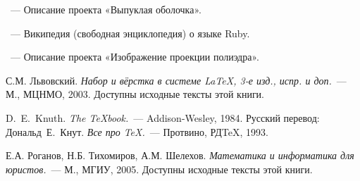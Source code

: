 \begin{thebibliography}{}

~---
Описание проекта «Выпуклая оболочка».

~---
Википедия (свободная энциклопедия) о языке Ruby.

~---
Описание проекта «Изображение проекции полиэдра».

С.М. Львовский.
{\em Набор и вёрстка в системе \LaTeX, 3-е изд., испр. и доп.}~---
М., МЦНМО, 2003. Доступны исходные тексты этой книги.

D.~E.~Knuth. {\em The \TeX{}book.}~---
Addison-Wesley, 1984. Русский перевод:
Дональд~Е.~Кнут.
{\em Все про \TeX.}~--- Протвино, РД\TeX, 1993.

Е.А. Роганов, Н.Б. Тихомиров, А.М. Шелехов.
{\em Математика и информатика для юристов.}~---
М., МГИУ, 2005.
Доступны исходные тексты этой книги.

\end{thebibliography}
